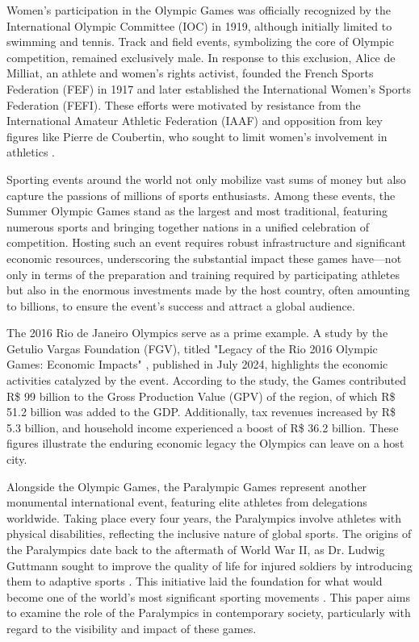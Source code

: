 \documentclass{article}
\begin{document}
Women’s participation in the Olympic Games was officially recognized by the International Olympic Committee (IOC) in 1919, although initially limited to swimming and tennis. Track and field events, symbolizing the core of Olympic competition, remained exclusively male. In response to this exclusion, Alice de Milliat, an athlete and women's rights activist, founded the French Sports Federation (FEF) in 1917 and later established the International Women's Sports Federation (FEFI). These efforts were motivated by resistance from the International Amateur Athletic Federation (IAAF) and opposition from key figures like Pierre de Coubertin, who sought to limit women’s involvement in athletics \cite{devide2005}.

Sporting events around the world not only mobilize vast sums of money but also capture the passions of millions of sports enthusiasts. Among these events, the Summer Olympic Games stand as the largest and most traditional, featuring numerous sports and bringing together nations in a unified celebration of competition. Hosting such an event requires robust infrastructure and significant economic resources, underscoring the substantial impact these games have—not only in terms of the preparation and training required by participating athletes but also in the enormous investments made by the host country, often amounting to billions, to ensure the event's success and attract a global audience.

The 2016 Rio de Janeiro Olympics serve as a prime example. A study by the Getulio Vargas Foundation (FGV), titled "Legacy of the Rio 2016 Olympic Games: Economic Impacts" \cite{FgvConhecimento}, published in July 2024, highlights the economic activities catalyzed by the event. According to the study, the Games contributed R\$ 99 billion to the Gross Production Value (GPV) of the region, of which R\$ 51.2 billion was added to the GDP. Additionally, tax revenues increased by R\$ 5.3 billion, and household income experienced a boost of R\$ 36.2 billion. These figures illustrate the enduring economic legacy the Olympics can leave on a host city.

Alongside the Olympic Games, the Paralympic Games represent another monumental international event, featuring elite athletes from delegations worldwide. Taking place every four years, the Paralympics involve athletes with physical disabilities, reflecting the inclusive nature of global sports. The origins of the Paralympics date back to the aftermath of World War II, as Dr. Ludwig Guttmann sought to improve the quality of life for injured soldiers by introducing them to adaptive sports \cite{paralimpiadas}. This initiative laid the foundation for what would become one of the world's most significant sporting movements . This paper aims to examine the role of the Paralympics in contemporary society, particularly with regard to the visibility and impact of these games.
\end{document}
